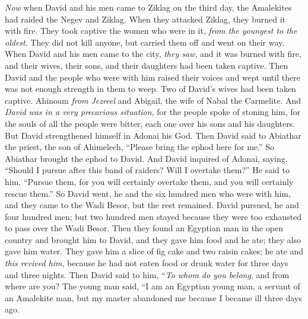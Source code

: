 \begin{biblechapter} %
 \textit{Now} when David and his men came to Ziklag on the third day, the Amalekites had raided the Negev and Ziklag. When they attacked Ziklag, they burned it with fire.
\verse They took captive the women who were in it, \textit{from the youngest to the oldest}. They did not kill anyone, but carried them off and went on their way.
\verse When David and his men came to the city, \textit{they saw}, and it was burned with fire, and their wives, their sons, and their daughters had been taken captive.
\verse Then David and the people who were with him raised their voices and wept until there was not enough strength in them to weep.
\verse Two of David’s wives had been taken captive. Ahinoam \textit{from Jezreel} and Abigail, the wife of Nabal the Carmelite.
\verse And \textit{David was in a very precarious situation}, for the people spoke of stoning him, for the souls of all the people were bitter, each one over his sons and his daughters. But David strengthened himself in Adonai his God.
\verse Then David said to Abiathar the priest, the son of Ahimelech, “Please bring the ephod here for me.” So Abiathar brought the ephod to David.
\verse And David inquired of Adonai, saying, “Should I pursue after this band of raiders? Will I overtake them?” He said to him, “Pursue them, for you will certainly overtake them, and you will certainly rescue them.”
\verse So David went, he and the six hundred men who were with him, and they came to the Wadi Besor, but the rest remained.
\verse David pursued, he and four hundred men; but two hundred men stayed because they were too exhausted to pass over the Wadi Besor.
\verse Then they found an Egyptian man in the open country and brought him to David, and they gave him food and he ate; they also gave him water.
\verse They gave him a slice of fig cake and two raisin cakes; he ate and \textit{this revived him}, because he had not eaten food or drunk water for three days and three nights.
\verse Then David said to him, “\textit{To whom do you belong}, and from where are you? The young man said, “I am an Egyptian young man, a servant of an Amalekite man, but my master abandoned me because I became ill three days ago.

\end{biblechapter}
